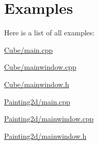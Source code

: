 \section{Examples}
Here is a list of all examples\+:\begin{DoxyCompactItemize}
\item 
\hyperlink{_cube_2main_8cpp-example}{Cube/main.\+cpp}
\item 
\hyperlink{_cube_2mainwindow_8cpp-example}{Cube/mainwindow.\+cpp}
\item 
\hyperlink{_cube_2mainwindow_8h-example}{Cube/mainwindow.\+h}
\item 
\hyperlink{_painting2d_2main_8cpp-example}{Painting2d/main.\+cpp}
\item 
\hyperlink{_painting2d_2mainwindow_8cpp-example}{Painting2d/mainwindow.\+cpp}
\item 
\hyperlink{_painting2d_2mainwindow_8h-example}{Painting2d/mainwindow.\+h}
\end{DoxyCompactItemize}
